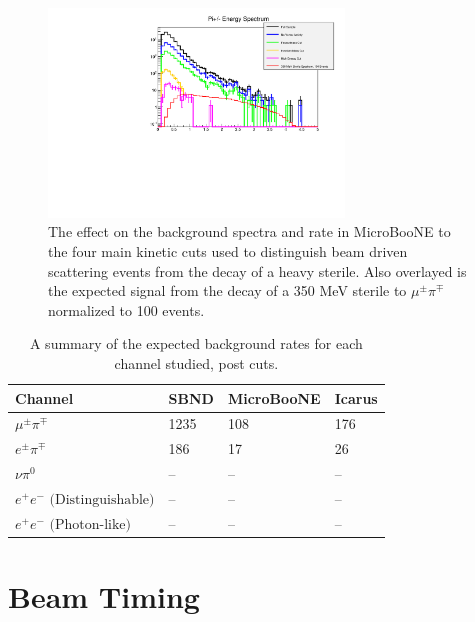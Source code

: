 \documentclass[11pt, a4paper]{article}
\begin{document}
\begin{figure}[t]
\center
\includegraphics[width=0.7\textwidth]{figures/cuts.pdf}
\caption{\label{fig:cuts} The effect on the background spectra and rate in MicroBooNE to the four main kinetic cuts used to distinguish beam driven scattering events from the decay of a heavy sterile. Also overlayed is the expected signal from the decay of a 350 MeV sterile to $\mu^\pm \pi^\mp$ normalized to 100 events.}
\end{figure}




\begin{table}[t]
\centering
\begin{tabular}{ l | l | l | l}
	Channel & SBND & MicroBooNE & Icarus \\
\hline\hline
\multirow{1}{*}{$\mu^\pm \pi^\mp$} & 1235 & 108 & 176 \\
\multirow{1}{*}{$ e^\pm \pi^\mp$}  & 186  & 17 & 26\\
\multirow{1}{*}{$ \nu \pi^0$}&  -- & -- & --\\
\multirow{1}{*}{$ e^+e^- \text{ (Distinguishable)} $} &  -- & -- & --\\
 \multirow{1}{*}{$ e^+ e^- \text{ (Photon-like)}$} & -- & -- & --\\
 \hline \hline

\end{tabular}
\caption{\label{tab:Rates_post_cuts} A summary of the expected background rates for each channel studied, post cuts. }
\end{table}


\section{Beam Timing}
\end{document}
